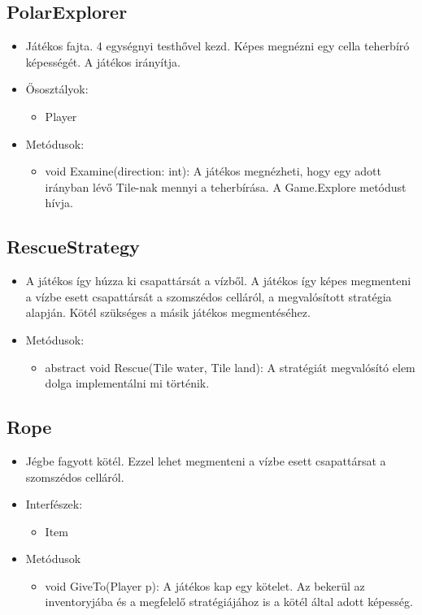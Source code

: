\subsection{PolarExplorer}
\begin{itemize}
	\item Játékos fajta. 4 egységnyi testhővel kezd. Képes megnézni egy cella teherbíró képességét. A játékos irányítja.
	\item Ősosztályok:
	\begin{itemize}
		\item Player
	\end{itemize}
	\item Metódusok:
	\begin{itemize}
		\item void Examine(direction: int): A játékos megnézheti, hogy egy adott irányban lévő Tile-nak mennyi a teherbírása. A Game.Explore metódust hívja.
	\end{itemize}
\end{itemize}

\subsection{RescueStrategy}
\begin{itemize}
	\item A játékos így húzza ki csapattársát a vízből. A játékos így képes megmenteni a vízbe esett csapattársát a szomszédos celláról, a megvalósított stratégia alapján. Kötél szükséges a másik játékos megmentéséhez.
	\item Metódusok:
	\begin{itemize}
		\item abstract void Rescue(Tile water, Tile land): A stratégiát megvalósító elem dolga implementálni mi történik.
	\end{itemize}
\end{itemize}

\subsection{Rope}
\begin{itemize}
	\item Jégbe fagyott kötél. Ezzel lehet megmenteni a vízbe esett csapattársat a szomszédos celláról.
	\item Interfészek:
	\begin{itemize}
		\item Item
	\end{itemize}
	\item Metódusok
	\begin{itemize}
		\item void GiveTo(Player p): A játékos kap egy kötelet. Az bekerül az inventoryjába és a megfelelő stratégiájához is a kötél által adott képesség.
	\end{itemize}
\end{itemize}

